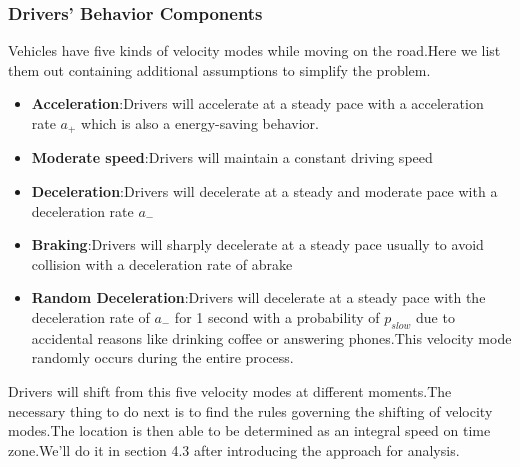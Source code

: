 \subsubsection{Drivers' Behavior Components}
Vehicles have five kinds of velocity modes while moving on the road.Here we list them out containing additional assumptions to simplify the problem.
\begin{itemize}
\item
\textbf{Acceleration}:Drivers will accelerate at a steady pace with a acceleration rate $a_+$ which is also a energy-saving behavior.\item
\textbf{Moderate speed}:Drivers will maintain a constant driving speed 
\item
\textbf{Deceleration}:Drivers will decelerate at a steady and moderate pace with a deceleration rate $a_-$
\item
\textbf{Braking}:Drivers will sharply decelerate at a steady pace usually to avoid collision with a deceleration rate of abrake
\item
\textbf{Random Deceleration}:Drivers will decelerate at a steady pace with the deceleration rate of $a_-$ for 1 second with a probability of $p_{slow}$ due to accidental reasons like drinking coffee or answering phones.This velocity mode randomly occurs during the entire process.
\end{itemize}

Drivers will shift from this five velocity modes at different moments.The necessary thing to do next is to find the rules governing the shifting of velocity modes.The location is then able to be determined as an integral speed on time zone.We'll do it in section 4.3 after introducing the approach for analysis.

